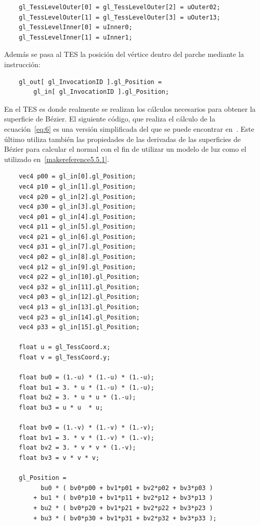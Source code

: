 \begin{verbatim}
    gl_TessLevelOuter[0] = gl_TessLevelOuter[2] = uOuter02;
    gl_TessLevelOuter[1] = gl_TessLevelOuter[3] = uOuter13;
    gl_TessLevelInner[0] = uInner0;
    gl_TessLevelInner[1] = uInner1;
\end{verbatim}

Además se pasa al TES la posición del vértice dentro del parche mediante la
instrucción:

\begin{verbatim}
    gl_out[ gl_InvocationID ].gl_Position =
        gl_in[ gl_InvocationID ].gl_Position;
\end{verbatim}

En el TES es donde realmente se realizan los cálculos necesarios para obtener la
superficie de Bézier. El siguiente código, que realiza el cálculo de la
ecuación~\eqref{eq:6} es una versión simplificada del que se puede encontrar
en~\citet{Bailey}. Este último utiliza también las propiedades de las derivadas
de las superficies de Bézier para calcular el normal con el fin de utilizar un
modelo de luz como el utilizado en~\ref{makereference5.5.1}.

\begin{verbatim}
    vec4 p00 = gl_in[0].gl_Position;
    vec4 p10 = gl_in[1].gl_Position;
    vec4 p20 = gl_in[2].gl_Position;
    vec4 p30 = gl_in[3].gl_Position;
    vec4 p01 = gl_in[4].gl_Position;
    vec4 p11 = gl_in[5].gl_Position;
    vec4 p21 = gl_in[6].gl_Position;
    vec4 p31 = gl_in[7].gl_Position;
    vec4 p02 = gl_in[8].gl_Position;
    vec4 p12 = gl_in[9].gl_Position;
    vec4 p22 = gl_in[10].gl_Position;
    vec4 p32 = gl_in[11].gl_Position;
    vec4 p03 = gl_in[12].gl_Position;
    vec4 p13 = gl_in[13].gl_Position;
    vec4 p23 = gl_in[14].gl_Position;
    vec4 p33 = gl_in[15].gl_Position;
    
    float u = gl_TessCoord.x;
    float v = gl_TessCoord.y;
    
    float bu0 = (1.-u) * (1.-u) * (1.-u);
    float bu1 = 3. * u * (1.-u) * (1.-u);
    float bu2 = 3. * u * u * (1.-u);
    float bu3 = u * u  * u;
    
    float bv0 = (1.-v) * (1.-v) * (1.-v);
    float bv1 = 3. * v * (1.-v) * (1.-v);
    float bv2 = 3. * v * v * (1.-v);
    float bv3 = v * v * v;
    
    gl_Position = 
          bu0 * ( bv0*p00 + bv1*p01 + bv2*p02 + bv3*p03 )
        + bu1 * ( bv0*p10 + bv1*p11 + bv2*p12 + bv3*p13 )
        + bu2 * ( bv0*p20 + bv1*p21 + bv2*p22 + bv3*p23 )
        + bu3 * ( bv0*p30 + bv1*p31 + bv2*p32 + bv3*p33 );

\end{verbatim}

